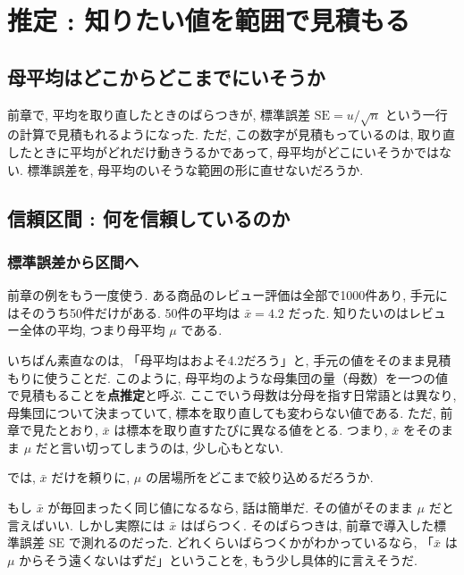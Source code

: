 \section{推定 : 知りたい値を範囲で見積もる}

  \subsection{母平均はどこからどこまでにいそうか}

    前章で, 平均を取り直したときのばらつきが, 標準誤差 $\mathrm{SE} = u/\sqrt{n}$ という一行の計算で見積もれるようになった.
    ただ, この数字が見積もっているのは, 取り直したときに平均がどれだけ動きうるかであって, 母平均がどこにいそうかではない.
    標準誤差を, 母平均のいそうな範囲の形に直せないだろうか.

  \subsection{信頼区間 : 何を信頼しているのか}

    \subsubsection*{標準誤差から区間へ}

    前章の例をもう一度使う.
    ある商品のレビュー評価は全部で1000件あり, 手元にはそのうち50件だけがある.
    50件の平均は $\bar{x} = 4.2$ だった.
    知りたいのはレビュー全体の平均, つまり母平均 $\mu$ である.

    いちばん素直なのは, 「母平均はおよそ4.2だろう」と, 手元の値をそのまま見積もりに使うことだ.
    このように, 母平均のような母集団の量（母数）を一つの値で見積もることを\textbf{点推定}と呼ぶ.
    ここでいう母数は分母を指す日常語とは異なり, 母集団について決まっていて, 標本を取り直しても変わらない値である.
    ただ, 前章で見たとおり, $\bar{x}$ は標本を取り直すたびに異なる値をとる.
    つまり, $\bar{x}$ をそのまま $\mu$ だと言い切ってしまうのは, 少し心もとない.

    では, $\bar{x}$ だけを頼りに, $\mu$ の居場所をどこまで絞り込めるだろうか.

    もし $\bar{x}$ が毎回まったく同じ値になるなら, 話は簡単だ.
    その値がそのまま $\mu$ だと言えばいい.
    しかし実際には $\bar{x}$ はばらつく.
    そのばらつきは, 前章で導入した標準誤差 $\mathrm{SE}$ で測れるのだった.
    どれくらいばらつくかがわかっているなら, 「$\bar{x}$ は $\mu$ からそう遠くないはずだ」ということを, もう少し具体的に言えそうだ.

